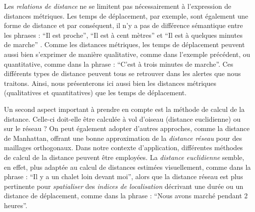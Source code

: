 Les \emph{relations de distance} ne se limitent pas nécessairement à
l'expression de distances métriques. Les temps de déplacement, par
exemple, sont également une forme de distance et par conséquent, il
n'y a pas de différence sémantique entre les phrases : \enquote{Il est
  proche}, \enquote{Il est à cent mètres} et \enquote{Il est à
  quelques minutes de marche} \autocite{Borillo1998,
  Egenhofer1995}. Comme les distances métriques, les temps de
déplacement peuvent aussi bien s'exprimer de manière qualitative,
comme dans l'exemple précédent, ou quantitative, comme dans la phrase
: \enquote{C'est à trois minutes de marche}.  Ces différents types de
distance peuvent tous se retrouver dans les alertes que nous
traitons. Ainsi, nous présenterons ici aussi bien les distances
métriques (qualitatives et quantitatives) que les temps de
déplacement.

Un second aspect important à prendre en compte est la méthode de
calcul de la distance. Celle-ci doit-elle être calculée à vol d'oiseau
(\ie distance euclidienne) ou sur le réseau ? On peut également
adopter d'autres approches, comme la distance de Manhattan, offrant
une bonne approximation de la \emph{distance réseau} pour des
maillages orthogonaux. Dans notre contexte d’application, différentes
méthodes de calcul de la distance peuvent être employées. La
\emph{distance euclidienne} semble, en effet, plus adaptée au calcul
de distances estimées visuellement, comme dans la phrase : \enquote{Il
  y a un chalet loin devant moi}, alors que la distance réseau est
plus pertinente pour \emph{spatialiser} des \emph{indices de
  localisation} décrivant une durée ou un distance de déplacement,
comme dans la phrase : \enquote{Nous avons marché pendant 2 heures}.

